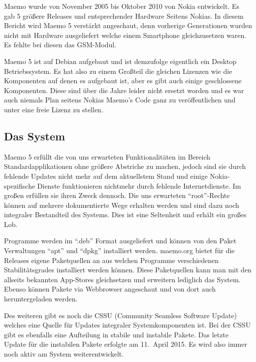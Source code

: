 Maemo wurde von November 2005\cite{online:maemo1-770} bis Oktober 2010\cite{online:maemo5-n900} von Nokia  entwickelt. Es gab 5 größere Releases und entsprechender Hardware Seitens Nokias\cite{online:maemo1-770}\cite{online:n800-specs}\cite{online:n810-specs}\cite{online:n900-specs}. In diesem Bericht wird Maemo 5 verstärkt angeschaut, denn vorherige Generationen wurden nicht mit Hardware ausgeliefert welche einem Smartphone gleichzusetzen waren. Es fehlte bei diesen das GSM-Modul.

Maemo 5 ist auf Debian aufgebaut\cite{online:maemo-about} und ist demzufolge eigentlich ein Desktop Betriebssystem. Es hat also zu einem Großteil die gleichen Lizenzen wie die Komponenten auf denen es aufgebaut ist, aber es gibt auch einige geschlossene Komponenten\cite{online:maemo5-components}. Diese sind über die Jahre leider nicht ersetzt worden und es war auch niemals Plan seitens Nokias Maemo's Code ganz zu veröffentlichen und unter eine freie Lizenz zu stellen\cite{online:maemo-slides}.\\

\subsection{Das System}
Maemo 5 erfüllt die von uns erwarteten Funktionalitäten im Bereich Standardapplikationen ohne größere Abstriche zu machen, jedoch sind sie durch fehlende Updates nicht mehr auf dem aktuellstem Stand und einige Nokia-spezifische Dienste funktionieren nichtmehr durch fehlende Internetdienste. Im großen erfüllen sie ihren Zweck dennoch. Die uns erwarteten ``root''-Rechte können auf mehrere dokumentierte Wege erhalten werden und sind dazu noch integraler Bestandteil des Systems\cite{online:maemo-root}. Dies ist eine Seltenheit und erhält ein großes Lob.

Programme werden im ``.deb'' Format ausgeliefert und können von den Paket Verwaltungen ``apt'' und ``dpkg'' installiert werden\cite{online:maemo-packetinstalling}.
\mbox{maemo.org} bietet für die Releases eigene Paketquellen an aus welchen Programme verschiedenen Stabilitätsgrades installiert werden können\cite{online:maemo-extras}. Diese Paketquellen kann man mit den allseits bekannten App-Stores gleichsetzen und erweitern lediglich das System. Ebenso können Pakete via Webbrowser angeschaut und von dort auch heruntergeladen  werden\cite{online:maemo-store}\cite{online:maemo-rawrepos}.

Des weiteren gibt es noch die CSSU\cite{online:maemo-cssu} (Community Seamless Software Update) welches eine Quelle für Updates integraler Systemkomponenten ist. Bei der CSSU gibt es ebenfalls eine Aufteilung in stabile und instabile Pakete. Das letzte Update für die instabilen Pakete erfolgte am 11.\ April 2015\cite{online:maemo-cssuchangelog}. Es wird also immer noch aktiv am System weiterentwickelt.

